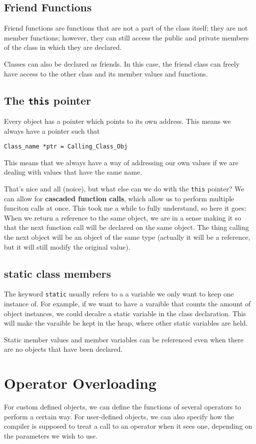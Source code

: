 \documentclass{article}
\begin{document}
\subsection{Friend Functions}
Friend functions are functions that are not a part of the class itself; they are not member functions; however,
they can still access the public and private members of the class in which they are declared.

Classes can also be declared as friends. In this case, the friend class can freely have access to the other class
and its member values and functions.

\subsection{The \texttt{this} pointer}
Every object has a pointer which points to its own address. This means we always have a pointer such that
\begin{verbatim}
Class_name *ptr = Calling_Class_Obj
\end{verbatim}
This means that we always have a way of addressing our own values if we are dealing with values that have the
same name.

That's nice and all (noice), but what else can we do with the \texttt{this} pointer? We can allow for
\textbf{cascaded function calls}, which allow us to perform multiple funciton calls at once.
This took me a while to fully understand, so here it goes: When we return a reference to the same object, 
we are in a sense making it so that the next function call will be declared on the same object. The thing
calling the next object will be an object of the same type (actually it will be a reference, but it will 
still modify the original value).
\subsection{static class members}
The keyword \texttt{static} usually refers to a a variable we only want to keep one instance of. For example,
if we want to have a varaible that counts the amount of object instances, we could decalre a static variable 
in the class declaration. This will make the varaible be kept in the heap, where other static variables are held.

Static member values and member variables can be referenced even when there are no objects that have
been declared.
\newpage
\section{Operator Overloading}
For custom defined objects, we can define the functions of several operators to perform a certain way. 
For user-defined objects, we can also specify how the compiler is supposed to treat a call to an operator
when it sees one, depending on the parameters we wish to use. 
\end{document}
